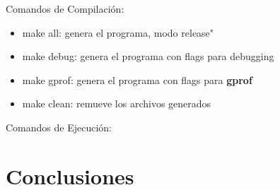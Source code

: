 \documentclass[a4paper,10pt]{article}
\begin{document}
Comandos de Compilaci\'on:

\begin{itemize}
 \item make all: genera el programa, modo release"
 \item make debug: genera el programa con flags para debugging
 \item make gprof: genera el programa con flags para \textbf{gprof}
 \item make clean: remueve los archivos generados
\end{itemize}

Comandos de Ejecuci\'on:

\begin{itemize}
\end{itemize}



\section{Conclusiones}

\begin{thebibliography}{99}


\end{thebibliography}
\end{document}
